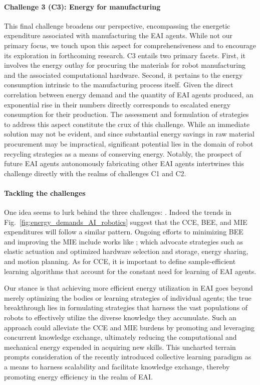 \documentclass[12pt]{article}
\begin{document}
\paragraph*{\textbf{Challenge 3} (C3): Energy for manufacturing}
This final challenge broadens our perspective, encompassing the energetic expenditure associated with manufacturing the EAI agents. While not our primary focus, we touch upon this aspect for comprehensiveness and to encourage its exploration in forthcoming research. C3 entails two primary facets. First, it involves the energy outlay for procuring the materials for robot manufacturing and the associated computational hardware. Second, it pertains to the energy consumption intrinsic to the manufacturing process itself. Given the direct correlation between energy demand and the quantity of EAI agents produced, an exponential rise in their numbers directly corresponds to escalated energy consumption for their production. The assessment and formulation of strategies to address this aspect constitute the crux of this challenge. While an immediate solution may not be evident, and since substantial energy savings in raw material procurement may be impractical, significant potential lies in the domain of robot recycling strategies as a means of conserving energy. Notably, the prospect of future EAI agents autonomously fabricating other EAI agents intertwines this challenge directly with the realms of challenges C1 and C2.

\paragraph*{\textbf{Tackling the challenges}}
One idea seems to lurk behind the three challenges: . Indeed the trends in Fig.~\ref{fig:energy_demands_AI_robotics} suggest that the CCE, BEE, and MIE expenditures will follow a similar pattern. Ongoing efforts to minimizing BEE and improving the MIE include works like \cite{schroder2014, chalmers2015, mohammed2014, chemnitz2011}; which advocate strategies such as elastic actuation and optimized hardware selection and storage, energy sharing, and motion planning. As for CCE, it is important to define sample-efficient learning algorithms that account for the constant need for learning of EAI agents. 

Our stance is that achieving more efficient energy utilization in EAI goes beyond merely optimizing the bodies or learning strategies of individual agents; the true breakthrough lies in formulating strategies that harness the vast populations of robots to effectively utilize the diverse knowledge they accumulate. Such an approach could alleviate the CCE and MIE burdens by promoting and leveraging concurrent knowledge exchange, ultimately reducing the computational and mechanical energy expended in acquiring new skills. This uncharted terrain prompts consideration of the recently introduced collective learning paradigm \cite{Haddadin2014SystemzumErstellen,Haddadin2015Systemgeneratingsets} as a means to harness scalability and facilitate knowledge exchange, thereby promoting energy efficiency in the realm of EAI.
\end{document}
